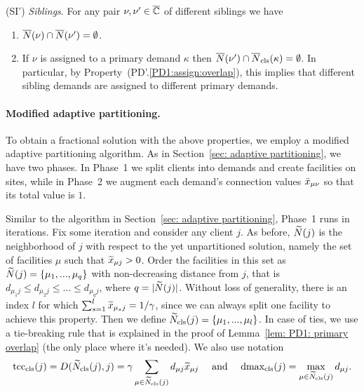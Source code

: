 \begin{description}
\begin{enumerate}
	\end{enumerate}
	
\item{(SI')} \emph{Siblings}. For any pair $\nu,\nu'\in\overline{\mathbb{C}}$ of different siblings we have
  \begin{enumerate}

	\item \label{SI1:siblings disjoint}
		  ${\overline{N}}(\nu)\cap {\overline{N}}(\nu') = \emptyset$.
		
	\item \label{SI1:primary disjoint} If $\nu$ is assigned to a primary demand $\kappa$ then
 		${\overline{N}}(\nu')\cap {\overline{N}}_{\text{cls}}(\kappa) = \emptyset$. In particular, by Property~(PD'.\ref{PD1:assign:overlap}),
		this implies that different sibling demands are assigned to different primary demands.

	\end{enumerate}
	
\end{description}


\paragraph{Modified adaptive partitioning.}
To obtain a fractional solution with the above properties,
we employ a modified adaptive partitioning algorithm. As
in Section~\ref{sec: adaptive partitioning}, we have two phases.
In Phase~1 we split clients into demands and create facilities on
sites, while in Phase~2 we augment each demand's
connection values ${\bar x}_{\mu\nu}$ so that its total value is $1$.

Similar to the algorithm in Section~\ref{sec: adaptive partitioning},
Phase~1 runs in iterations. Fix some iteration and consider any client $j$.  As before,
${\widetilde N}(j)$ is the neighborhood of $j$ with respect to the yet
unpartitioned solution, namely the set of facilities $\mu$ such that
${\widetilde x}_{\mu j}>0$. Order the facilities in this set as
${\widetilde N}(j) = { \left\{ \mu_1,...,\mu_q \right\} }$ with non-decreasing
distance from $j$, that is
$d_{\mu_1 j} \leq d_{\mu_2 j} \leq \ldots \leq d_{\mu_q j}$, where
$q = |{\widetilde N}(j)|$. Without loss of generality, there is an index
$l$ for which $\sum_{s=1}^l {\widetilde x}_{\mu_s j} = 1/\gamma$, since we can
always split one facility to achieve this property. Then we define
${\widetilde N}_{\text{cls}}(j) = { \left\{ \mu_1,...,\mu_l \right\} }$. In case of ties, we use
a tie-breaking rule that is explained in the proof of Lemma~\ref{lem: PD1: primary overlap}
(the only place where it's needed). We also use notation
%
\begin{equation*}
\mbox{\rm{tcc}}_{\text{cls}}(j) =  D({\widetilde N}_{\text{cls}}(j), j) = \gamma\sum_{\mu\in{\widetilde N}_{\text{cls}}(j)} d_{\mu j} {\widetilde x}_{\mu j}
			\quad\textrm{ and }\quad
 \mbox{\rm{dmax}}_{\text{cls}}(j) = \max_{\mu \in {\widetilde N}_{\text{cls}}(j)} d_{\mu j}. 
\end{equation*}
%

